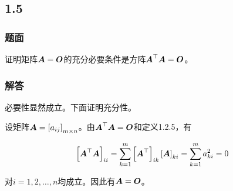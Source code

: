 \documentclass[9pt,xcolor=svgnames]{beamer} %
\begin{document}
\subsection*{1.5}
\begin{frame}
    \frametitle{题面}
    证明矩阵\(\boldsymbol{A}=\boldsymbol{O}\)的充分必要条件是方阵\(\boldsymbol{A}^\top\boldsymbol{A}=\boldsymbol{O}\)。
\end{frame}
\begin{frame}
    \frametitle{解答}
    必要性显然成立。下面证明充分性。

    设矩阵\(\boldsymbol{A}=\left[ a_{ij} \right]_{m\times n}\)。由\(\boldsymbol{A}^\top\boldsymbol{A}=\boldsymbol{O}\)和定义1.2.5，有

    \begin{equation*}
        \left[ \boldsymbol{A}^\top\boldsymbol{A} \right]_{ii}=\sum_{k=1}^m\left[ \boldsymbol{A}^\top \right]_{ik}\left[ \boldsymbol{A} \right]_{ki}=\sum_{k=1}^ma_{ki}^2=0
    \end{equation*}

    对\(i=1,2,\dots,n\)均成立。因此有\(\boldsymbol{A}=\boldsymbol{O}\)。
\end{frame}
\end{document}
